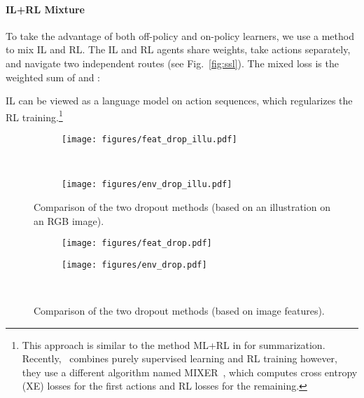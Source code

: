 \documentclass[11pt,a4paper]{article}
\begin{document}
\paragraph{IL+RL Mixture}
To take the advantage of both off-policy and on-policy learners, we use a method to mix IL and RL. 
The IL and RL agents share weights, take actions separately, and navigate two independent routes (see Fig.~\ref{fig:ssl}).
The mixed loss is the weighted sum of  and :

IL can be viewed as a language model on action sequences, which regularizes the RL training.\footnote{This approach is similar to the method ML+RL in  for summarization. 
Recently,~\citet{wang2018look} combines purely supervised learning and RL training however, they use a different algorithm named MIXER~\cite{ranzato2015sequence}, which computes cross entropy (XE) losses for the first  actions and RL losses for the remaining.}

\begin{figure*}[t]
    \begin{subfigure}[t]{0.48\textwidth}
        \centering
        \texttt{[image: figures/feat\_drop\_illu.pdf]}
        \label{fig:feat_drop_illu}
    \end{subfigure} 
    ~
    \begin{subfigure}[t]{0.48\textwidth}
        \centering
        \texttt{[image: figures/env\_drop\_illu.pdf]}
        \label{fig:env_drop_illu}
    \end{subfigure}
    \vspace{3pt}
    \caption{Comparison of the two dropout methods (based on an illustration on an RGB image).}
\end{figure*}

\begin{figure}[t]
    \centering
    \begin{subfigure}[t]{0.23\textwidth}
        \centering
        \texttt{[image: figures/feat\_drop.pdf]}
        \label{fig:feat_drop_cubic}
    \end{subfigure}\begin{subfigure}[t]{0.23\textwidth}
        \centering
        \texttt{[image: figures/env\_drop.pdf]}
        \label{fig:env_drop_cubic}
    \end{subfigure}\\
    \vspace{4pt}
    \caption{Comparison of the two dropout methods (based on image features).}
    \vspace{-1pt}
\end{figure}
\end{document}

